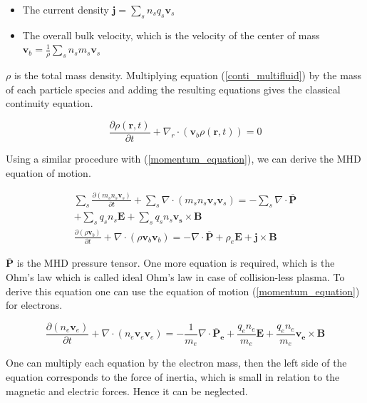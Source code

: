 \documentclass[a4paper,11pt]{thesis}
\begin{document}
\begin{itemize}
  \item The current density $\mathbf{j}=\sum_s n_s q_s \mathbf{v}_s$
  \item The overall bulk velocity, which is the velocity of the
  center of mass $\mathbf{v}_b=\frac{1}{\rho}\sum_s n_s m_s \mathbf{v}_s$
\end{itemize}

$\rho$ is the total mass density. Multiplying equation
(\ref{conti_multifluid}) by the mass of each particle species and
adding the resulting equations gives the classical continuity
equation.

\begin{equation}\label{conti}
    \frac{\partial \rho(\mathbf{r},t)}{\partial t}+\nabla_r \cdot (\mathbf{v}_b\rho(\mathbf{r},t)
    )=0
\end{equation}

Using a similar procedure with (\ref{momentum_equation}), we can
derive the MHD equation of motion.

\begin{eqnarray}
     \sum_s \frac{\partial (m_s n_s \mathbf{v}_s)}{\partial t}+
     \sum_s \nabla \cdot (m_s n_s \mathbf{v}_s  \mathbf{v}_s)
     = -\sum_s \nabla \cdot \overline{\mathbf{P}} \\
  + \sum_s q_s n_s
     \mathbf{E}+ \sum_s q_s n_s \mathbf{v_s}\times
     \mathbf{B} \nonumber \\
      \frac{\partial (\rho \mathbf{v}_b)}{\partial t}+  \nabla \cdot
      (\rho \mathbf{v}_b  \mathbf{v}_b) = -\nabla \cdot \overline{\mathbf{P}} +
      \rho_e \mathbf{E}+ \mathbf{j} \times
     \mathbf{B}
\end{eqnarray}

$\overline{\mathbf{P}}$ is the MHD pressure tensor. One more equation is
required, which is the Ohm's law which is called ideal Ohm's law in case
of collision-less plasma. To derive this equation one can use the
equation of motion (\ref{momentum_equation}) for electrons.

\begin{equation}
     \frac{\partial (n_e \mathbf{v}_e)}{\partial t}+ \nabla \cdot
     (n_e \mathbf{v}_e  \mathbf{v}_e) = -\frac{1}{m_e}\nabla \cdot
     \mathbf{\overline{P}_e} + \frac{q_e n_e}{m_e} \mathbf{E}+\frac{q_e n_e}
     {m_e}\mathbf{v_e}\times \mathbf{B}
\end{equation}


One can multiply each equation by the electron mass, then the left
side of the equation corresponds to the force of inertia, which is
small in relation to the magnetic and electric forces. Hence it can
be neglected.
\end{document}
